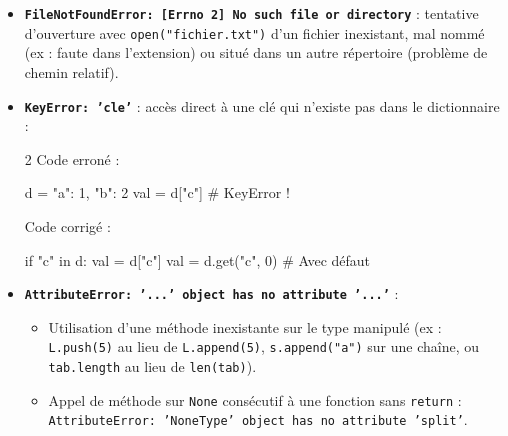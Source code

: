 \documentclass[11pt,a4paper]{article}
\begin{document}
\begin{tcolorbox}[left=0cm,title=\bf{\faBug \; 7. Fichiers, dictionnaires et attributs (KeyError, AttributeError)},colbacktitle=cfond]
\begin{itemize}
	\item[\textbullet] \textbf{\texttt{FileNotFoundError: [Errno 2] No such file or directory}} : tentative d'ouverture avec \texttt{open("fichier.txt")} d'un fichier inexistant, mal nommé (ex : faute dans l'extension) ou situé dans un autre répertoire (problème de chemin relatif).

	\item[\textbullet] \textbf{\texttt{KeyError: 'cle'}} : accès direct à une clé qui n'existe pas dans le dictionnaire :
	\setlength{\multicolsep}{0pt}
	\begin{multicols}{2}
		\textcolor{BrickRed}{\faTimesCircle \; Code erroné :}
		\begin{python}
d = {"a": 1, "b": 2}
val = d["c"] # KeyError !
		\end{python}
		\textcolor{OliveGreen}{\faCheckCircle \; Code corrigé :}
		\begin{python}
if "c" in d:
    val = d["c"]
val = d.get("c", 0) # Avec défaut
		\end{python}
	\end{multicols}

	\item[\textbullet] \textbf{\texttt{AttributeError: '...' object has no attribute '...'}} :
	\begin{itemize}
		\item[\ding{226}] Utilisation d'une méthode inexistante sur le type manipulé (ex : \texttt{L.push(5)} au lieu de \texttt{L.append(5)}, \texttt{s.append("a")} sur une chaîne, ou \texttt{tab.length} au lieu de \texttt{len(tab)}).
		\item[\ding{226}] Appel de méthode sur \texttt{None} consécutif à une fonction sans \texttt{return} : \texttt{AttributeError: 'NoneType' object has no attribute 'split'}.
	\end{itemize}
\end{itemize}
\end{tcolorbox}
\end{document}
